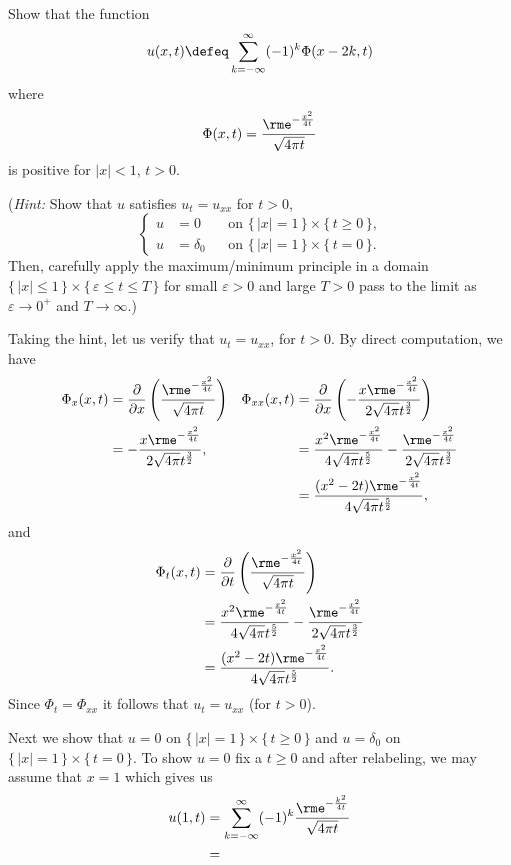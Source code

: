 \begin{problem}
  Show that the function
  \[
    u(x,t)\defeq\sum_{k=-\infty}^\infty (-1)^k\Phi(x-2k,t)
  \]
  where
  \[
    \Phi(x,t)=\frac{\rme^{-\frac{x^2}{4t}}}{\sqrt{4\pi t}}
  \]
  is positive for \(|x|<1\), \(t>0\).

  \noindent (\emph{Hint:} Show that \(u\) satisfies \(u_t=u_{xx}\) for
  \(t>0\),
  \[
    \left\{
      \begin{aligned}
        u&=0&&\text{on \(\{\,|x|=1\,\}\times\{\,t\geq 0\,\}\),}\\
        u&=\delta_0&&\text{on \(\{\,|x|=1\,\}\times\{\,t=0\,\}\).}
      \end{aligned}
    \right.
  \]
  Then, carefully apply the maximum/minimum principle in a domain
  \(\{\,|x|\leq 1\,\}\times\{\,\varepsilon\leq t\leq T\,\}\) for small
  \(\varepsilon>0\) and large \(T>0\) pass to the limit as \(\varepsilon\to
  0^+\) and \(T\to\infty\).)
\end{problem}
\begin{solution}
  Taking the hint, let us verify that \(u_t=u_{xx}\), for \(t>0\). By
  direct computation, we have
  \begin{align*}
    \Phi_x(x,t)
    &=\frac{\partial}{\partial x}
      \left(\frac{\rme^{-\frac{x^2}{4t}}}{\sqrt{4\pi t}}\right)
    &\Phi_{xx}(x,t)
    &=\frac{\partial}{\partial x}
      \left(-\frac{x\rme^{-\frac{x^2}{4t}}}{2\sqrt{4\pi}t^{\frac{3}{2}}}\right)\\
    &=-\frac{x\rme^{-\frac{x^2}{4t}}}{2\sqrt{4\pi}t^{\frac{3}{2}}},
    &&=\frac{x^2\rme^{-\frac{x^2}{4t}}}{4\sqrt{4\pi}t^{\frac{5}{2}}}
      -\frac{\rme^{-\frac{x^2}{4t}}}{2\sqrt{4\pi}t^{\frac{3}{2}}}
    \\
    &&&=\frac{(x^2-2t)\rme^{-\frac{x^2}{4t}}}{4\sqrt{4\pi}t^{\frac{5}{2}}},
  \end{align*}
  and
  \begin{align*}
    \Phi_t(x,t)
    &=\frac{\partial}{\partial t}
      \left(\frac{\rme^{-\frac{x^2}{4t}}}{\sqrt{4\pi t}}\right)\\
    &=\frac{x^2\rme^{-\frac{x^2}{4t}}}{4\sqrt{4\pi}t^{\frac{5}{2}}}
      -\frac{\rme^{-\frac{x^2}{4t}}}{2\sqrt{4\pi}t^{\frac{3}{2}}}\\
    &=\frac{(x^2-2t)\rme^{-\frac{x^2}{4t}}}{4\sqrt{4\pi}t^{\frac{5}{2}}}.
  \end{align*}
  Since \(\Phi_t=\Phi_{xx}\) it follows that \(u_t=u_{xx}\) (for \(t>0\)).

  Next we show that \(u=0\) on \(\{\,|x|=1\,\}\times\{\,t\geq 0\,\}\) and
  \(u=\delta_0\) on \(\{\,|x|=1\,\}\times\{\,t=0\,\}\). To show \(u=0\) fix
  a \(t\geq 0\) and after relabeling, we may assume that \(x=1\) which
  gives us
  \begin{align*}
    u(1,t)
    &=\sum_{k=-\infty}^\infty(-1)^k\frac{\rme^{-\frac{k^2}{4t}}}{\sqrt{4\pi
      t}}\\
    &=
  \end{align*}
\end{solution}
\newpage

